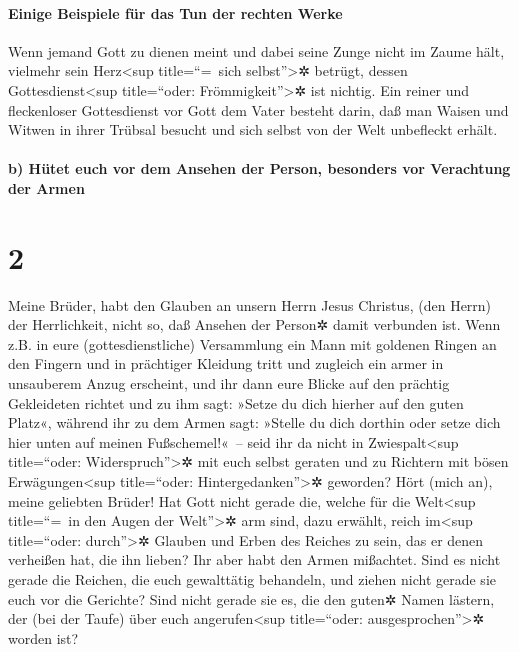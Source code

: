 \hypertarget{einige-beispiele-fuxfcr-das-tun-der-rechten-werke}{%
\paragraph{Einige Beispiele für das Tun der rechten
Werke}\label{einige-beispiele-fuxfcr-das-tun-der-rechten-werke}}

 Wenn jemand Gott zu dienen meint und dabei seine Zunge
nicht im Zaume hält, vielmehr sein Herz\textless sup title=``=~sich
selbst''\textgreater✲ betrügt, dessen Gottesdienst\textless sup
title=``oder: Frömmigkeit''\textgreater✲ ist nichtig. 
Ein reiner und fleckenloser Gottesdienst vor Gott dem Vater besteht
darin, daß man Waisen und Witwen in ihrer Trübsal besucht und sich
selbst von der Welt unbefleckt erhält.

\hypertarget{b-huxfctet-euch-vor-dem-ansehen-der-person-besonders-vor-verachtung-der-armen}{%
\paragraph{b) Hütet euch vor dem Ansehen der Person, besonders vor
Verachtung der
Armen}\label{b-huxfctet-euch-vor-dem-ansehen-der-person-besonders-vor-verachtung-der-armen}}

\hypertarget{section-1}{%
\section{2}\label{section-1}}

 Meine Brüder, habt den Glauben an unsern Herrn Jesus
Christus, (den Herrn) der Herrlichkeit, nicht so, daß Ansehen der
Person✲ damit verbunden ist.  Wenn z.B. in eure
(gottesdienstliche) Versammlung ein Mann mit goldenen Ringen an den
Fingern und in prächtiger Kleidung tritt und zugleich ein armer in
unsauberem Anzug erscheint,  und ihr dann eure Blicke auf
den prächtig Gekleideten richtet und zu ihm sagt: »Setze du dich hierher
auf den guten Platz«, während ihr zu dem Armen sagt: »Stelle du dich
dorthin oder setze dich hier unten auf meinen Fußschemel!«~--
 seid ihr da nicht in Zwiespalt\textless sup title=``oder:
Widerspruch''\textgreater✲ mit euch selbst geraten und zu Richtern mit
bösen Erwägungen\textless sup title=``oder:
Hintergedanken''\textgreater✲ geworden?  Hört (mich an),
meine geliebten Brüder! Hat Gott nicht gerade die, welche für die
Welt\textless sup title=``=~in den Augen der Welt''\textgreater✲ arm
sind, dazu erwählt, reich im\textless sup title=``oder:
durch''\textgreater✲ Glauben und Erben des Reiches zu sein, das er denen
verheißen hat, die ihn lieben?  Ihr aber habt den Armen
mißachtet. Sind es nicht gerade die Reichen, die euch gewalttätig
behandeln, und ziehen nicht gerade sie euch vor die Gerichte?
 Sind nicht gerade sie es, die den guten✲ Namen lästern,
der (bei der Taufe) über euch angerufen\textless sup title=``oder:
ausgesprochen''\textgreater✲ worden ist?

